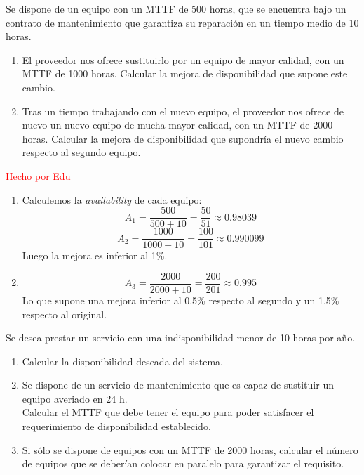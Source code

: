 \Problem[1]
Se dispone de un equipo con un MTTF de 500 horas, que se encuentra bajo un contrato de mantenimiento que garantiza su reparación en un tiempo medio de 10 horas.
\begin{enumerate}
  \item El proveedor nos ofrece sustituirlo por un equipo de mayor calidad, con un MTTF de 1000 horas. Calcular la mejora de disponibilidad que supone este cambio.
  \item Tras un tiempo trabajando con el nuevo equipo, el proveedor nos ofrece de nuevo un nuevo equipo de mucha mayor calidad, con un MTTF de 2000 horas. Calcular la mejora de disponibilidad que supondría el nuevo cambio respecto al segundo equipo.
\end{enumerate}

\TheSolution
\textcolor{red}{Hecho por Edu}

\begin{enumerate}
  \item
  Calculemos la \textit{availability} de cada equipo:
  \[ A_1 = \frac{500}{500+10} = \frac{50}{51} \approx 0.98039 \]
  \[ A_2 = \frac{1000}{1000+10} = \frac{100}{101} \approx 0.990099 \]
  Luego la mejora es inferior al 1\%.

  \item
  \[ A_3 = \frac{2000}{2000+10} = \frac{200}{201} \approx 0.995 \]
  Lo que supone una mejora inferior al 0.5\% respecto al segundo y un 1.5\% respecto al original.

\end{enumerate}

\Problem[2]
Se desea prestar un servicio con una indisponibilidad menor de 10 horas por
año.
  \begin{enumerate}
    	\item Calcular la disponibilidad deseada del sistema.
    	\item Se dispone de un servicio de mantenimiento que es capaz de sustituir un equipo averiado en 24 h.\\
Calcular el MTTF que debe tener el equipo para poder satisfacer el requerimiento de disponibilidad establecido.
    	\item Si sólo se dispone de equipos con un MTTF de 2000 horas, calcular el número de equipos que se deberían colocar en paralelo para garantizar el requisito.
  \end{enumerate}

